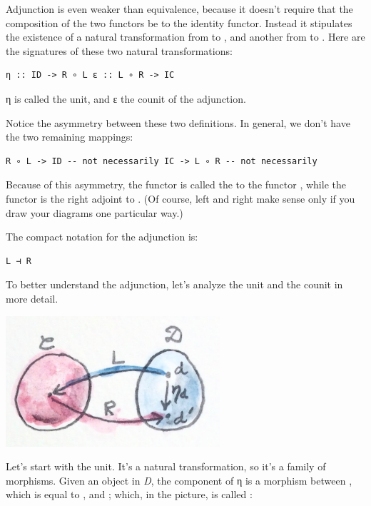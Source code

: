 Adjunction is even weaker than equivalence, because it doesn't require
that the composition of the two functors be  to the
identity functor. Instead it stipulates the existence of a  natural transformation from  to , and
another from  to . Here are the signatures of
these two natural transformations:

\begin{verbatim}
η :: ID -> R ∘ L ε :: L ∘ R -> IC
\end{verbatim}

η is called the unit, and ε the counit of the adjunction.

Notice the asymmetry between these two definitions. In general, we don't
have the two remaining mappings:

\begin{verbatim}
R ∘ L -> ID -- not necessarily IC -> L ∘ R -- not necessarily
\end{verbatim}

Because of this asymmetry, the functor  is called the
 to the functor , while the functor
 is the right adjoint to . (Of course, left and
right make sense only if you draw your diagrams one particular way.)

The compact notation for the adjunction is:

\begin{verbatim}
L ⊣ R
\end{verbatim}

To better understand the adjunction, let's analyze the unit and the
counit in more detail.

\includegraphics[width=3.12500in]{images/adj-unit.jpg}

Let's start with the unit. It's a natural transformation, so it's a
family of morphisms. Given an object  in \emph{D}, the
component of η is a morphism between , which is equal to
, and ; which, in the picture, is called
:


